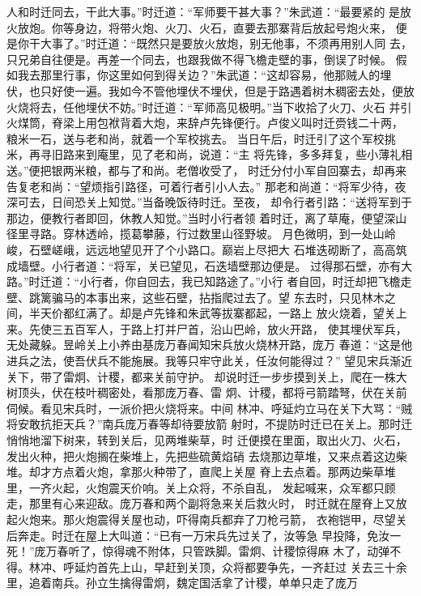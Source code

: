 人和时迁同去，干此大事。”时迁道：“军师要干甚大事？”朱武道：“最要紧的
是放火放炮。你等身边，将带火炮、火刀、火石，直要去那寨背后放起号炮火来，
便是你干大事了。”时迁道：“既然只是要放火放炮，别无他事，不须再用别人同
去，只兄弟自往便是。再差一个同去，也跟我做不得飞檐走壁的事，倒误了时候。
假如我去那里行事，你这里如何到得关边？”朱武道：“这却容易，他那贼人的埋
伏，也只好使一遍。我如今不管他埋伏不埋伏，但是于路遇着树木稠密去处，便放
火烧将去，任他埋伏不妨。”时迁道：“军师高见极明。”当下收拾了火刀、火石
并引火煤筒，脊梁上用包袱背着大炮，来辞卢先锋便行。卢俊义叫时迁赍钱二十两，
粮米一石，送与老和尚，就着一个军校挑去。
当日午后，时迁引了这个军校挑米，再寻旧路来到庵里，见了老和尚，说道：“主
将先锋，多多拜复，些小薄礼相送。”便把银两米粮，都与了和尚。老僧收受了，
时迁分付小军自回寨去，却再来告复老和尚：“望烦指引路径，可着行者引小人去。”
那老和尚道：“将军少待，夜深可去，日间恐关上知觉。”当备晚饭待时迁。至夜，
却令行者引路：“送将军到于那边，便教行者即回，休教人知觉。”当时小行者领
着时迁，离了草庵，便望深山径里寻路。穿林透岭，揽葛攀藤，行过数里山径野坡。
月色微明，到一处山岭峻，石壁嵯峨，远远地望见开了个小路口。巅岩上尽把大
石堆迭砌断了，高高筑成墙壁。小行者道：“将军，关已望见，石迭墙壁那边便是。
过得那石壁，亦有大路。”时迁道：“小行者，你自回去，我已知路途了。”小行
者自回，时迁却把飞檐走壁、跳篱骗马的本事出来，这些石壁，拈指爬过去了。望
东去时，只见林木之间，半天价都红满了。却是卢先锋和朱武等拔寨都起，一路上
放火烧着，望关上来。先使三五百军人，于路上打并尸首，沿山巴岭，放火开路，
使其埋伏军兵，无处藏躲。昱岭关上小养由基庞万春闻知宋兵放火烧林开路，庞万
春道：“这是他进兵之法，使吾伏兵不能施展。我等只牢守此关，任汝何能得过？”
望见宋兵渐近关下，带了雷炯、计稷，都来关前守护。
却说时迁一步步摸到关上，爬在一株大树顶头，伏在枝叶稠密处，看那庞万春、雷
炯、计稷，都将弓箭踏弩，伏在关前伺候。看见宋兵时，一派价把火烧将来。中间
林冲、呼延灼立马在关下大骂：“贼将安敢抗拒天兵？”南兵庞万春等却待要放箭
射时，不提防时迁已在关上。那时迁悄悄地溜下树来，转到关后，见两堆柴草，时
迁便摸在里面，取出火刀、火石，发出火种，把火炮搁在柴堆上，先把些硫黄焰硝
去烧那边草堆，又来点着这边柴堆。却才方点着火炮，拿那火种带了，直爬上关屋
脊上去点着。那两边柴草堆里，一齐火起，火炮震天价响。关上众将，不杀自乱，
发起喊来，众军都只顾走，那里有心来迎敌。庞万春和两个副将急来关后救火时，
时迁就在屋脊上又放起火炮来。那火炮震得关屋也动，吓得南兵都弃了刀枪弓箭，
衣袍铠甲，尽望关后奔走。时迁在屋上大叫道：“已有一万宋兵先过关了，汝等急
早投降，免汝一死！”庞万春听了，惊得魂不附体，只管跌脚。雷炯、计稷惊得麻
木了，动弹不得。林冲、呼延灼首先上山，早赶到关顶，众将都要争先，一齐赶过
关去三十余里，追着南兵。孙立生擒得雷炯，魏定国活拿了计稷，单单只走了庞万
